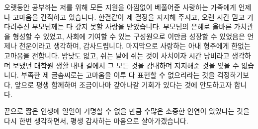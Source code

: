 오랫동안 공부하는 저를 위해 모든 지원을 아낌없이 베풀어준 사랑하는 가족에게 언제나 고마움을 간직하고 있습니다. 한결같이 제 결정을 지지해 주시고, 오랜 시간 믿고 기다려주신 부모님께는 다 갚지 못할 사랑을 받았습니다. 부모님의 은혜로 올바른 가치관을 형성할 수 있었고, 사회에 기여할 수 있는 구성원으로 이만큼 성장할 수 있었음은 언제나 천운이라고 생각하며, 감사드립니다. 마지막으로 사랑하는 아내 형주에게 한없는 고마움을 전합니다. 밤낮도 없고, 쉬는 날에 쉬는 것이 사치이자 시간 낭비라고 생각하며 보냈던 대학원 생활 내내 곁에서 그 모든 것을 감내하며 지지해준 것을 잊을 수 없습니다. 부족한 제 글솜씨로는 고마움을 이루 다 표현할 수 없으리라는 것을 걱정하기보다, 앞으로 평생 함께하며 조금이나마 갚아나갈 기회가 있다는 것에 안도하고자 합니다.

끝으로 짧은 인생에 일일이 거명할 수 없을 만큼 수많은 소중한 인연이 있었다는 것을 다시 한번 생각하면서, 평생 감사하는 마음으로 살아가겠습니다.


